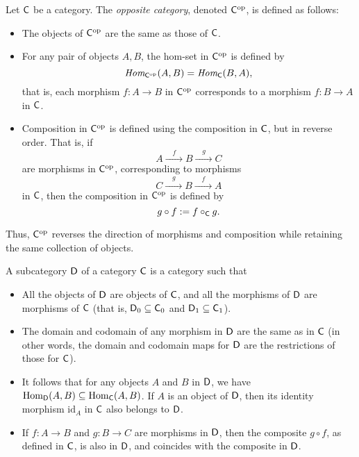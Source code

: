 \begin{definition} 
Let \(\mathsf{C}\) be a category. The \emph{opposite category}, denoted \(\mathsf{C}^{\mathrm{op}}\), is defined as follows:
\begin{itemize}
  \item The objects of \(\mathsf{C}^{\mathrm{op}}\) are the same as those of \(\mathsf{C}\).
  \item For any pair of objects \(A, B\), the hom-set in \(\mathsf{C}^{\mathrm{op}}\) is defined by
  \[
  \textit{Hom}_{\mathsf{C}^{\mathrm{op}}}(A, B) = \textit{Hom}_{\mathsf{C}}(B, A),
  \]
  that is, each morphism \(f: A \to B\) in \(\mathsf{C}^{\mathrm{op}}\) corresponds to a morphism \(f: B \to A\) in \(\mathsf{C}\).
  \item Composition in \(\mathsf{C}^{\mathrm{op}}\) is defined using the composition in \(\mathsf{C}\), but in reverse order. That is, if
  \[
  A \xrightarrow{ \quad f \quad } B \xrightarrow{\quad g \quad } C
  \]
  are morphisms in \(\mathsf{C}^{\mathrm{op}}\), corresponding to morphisms
  \[
  C \xrightarrow{ \quad g \quad} B \xrightarrow{ \quad f \quad} A
  \]
  in \(\mathsf{C}\), then the composition in \(\mathsf{C}^{\mathrm{op}}\) is defined by
  \[
  g \circ f := f \circ_{\mathsf{C}} g.
  \]
\end{itemize}

Thus, \(\mathsf{C}^{\mathrm{op}}\) reverses the direction of morphisms and composition while retaining the same collection of objects.
\end{definition}

\begin{definition}
  A subcategory \( \mathsf{D} \) of a category \( \mathsf{C} \) is a category such that 
  \begin{itemize}
    \item All the objects of \( \mathsf{D} \) are objects of \( \mathsf{C} \), and all the morphisms of \( \mathsf{D} \) are morphisms of \( \mathsf{C} \) (that is, \( \mathsf{D}_0 \subseteq \mathsf{C}_0 \) and \( \mathsf{D}_1 \subseteq \mathsf{C}_1 \)).
    \item The domain and codomain of any morphism in \( \mathsf{D} \) are the same as in \( \mathsf{C} \) (in other words, the domain and codomain maps for \( \mathsf{D} \) are the restrictions of those for \( \mathsf{C} \)).
    \item  It follows that for any objects \( A \) and \( B \) in \( \mathsf{D} \), we have \( \mathrm{Hom}_{\mathsf{D}}(A, B) \subseteq \mathrm{Hom}_{\mathsf{C}}(A, B) \). If \( A \) is an object of \( \mathsf{D} \), then its identity morphism \( \mathrm{id}_A \) in \( \mathsf{C} \) also belongs to \( \mathsf{D} \).
    \item If \( f: A \to B \) and \( g: B \to C \) are morphisms in \( \mathsf{D} \), then the composite \( g \circ f \), as defined in \( \mathsf{C} \), is also in \( \mathsf{D} \), and coincides with the composite in \( \mathsf{D} \).
  \end{itemize}
  
\end{definition}

